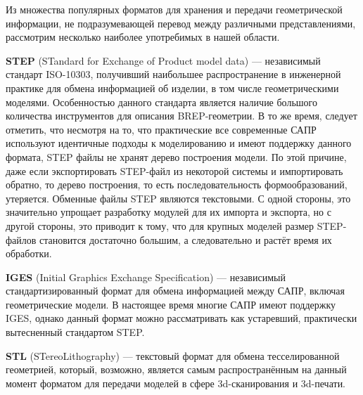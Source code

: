 Из множества популярных форматов для хранения и передачи геометрической информации, не подразумевающей перевод между различными представлениями, рассмотрим несколько наиболее употребимых в нашей области.


\textbf{STEP} (STandard for Exchange of Product model data) --- независимый стандарт ISO-10303, получивший наибольшее распространение в инженерной практике для обмена информацией об изделии, в том числе геометрическими моделями.
Особенностью данного стандарта является наличие большого количества инструментов для описания BREP-геометрии. В то же время, следует отметить, что несмотря на то, что практические все современные САПР используют идентичные подходы к моделированию и имеют поддержку данного формата, STEP файлы не хранят дерево построения модели. По этой причине, даже если экспортировать STEP-файл из некоторой системы и импортировать обратно, то дерево построения, то есть последовательность формообразований, утеряется.
Обменные файлы STEP являются текстовыми. С одной стороны, это значительно упрощает разработку модулей для их импорта и экспорта, но с другой стороны, это приводит к тому, что для крупных моделей размер STEP-файлов становится достаточно большим, а следовательно и растёт время их обработки.


\textbf{IGES} (Initial Graphics Exchange Specification) --- независимый стандартизированный формат для обмена информацией между САПР, включая геометрические модели. В настоящее время многие САПР имеют поддержку IGES, однако данный формат можно рассматривать как устаревший, практически вытесненный стандартом STEP.


\textbf{STL} (STereoLithography) --- текстовый формат для обмена тесселированной геометрией, который, возможно, является самым распространённым на данный момент форматом для передачи моделей в сфере 3d-сканирования и 3d-печати.

